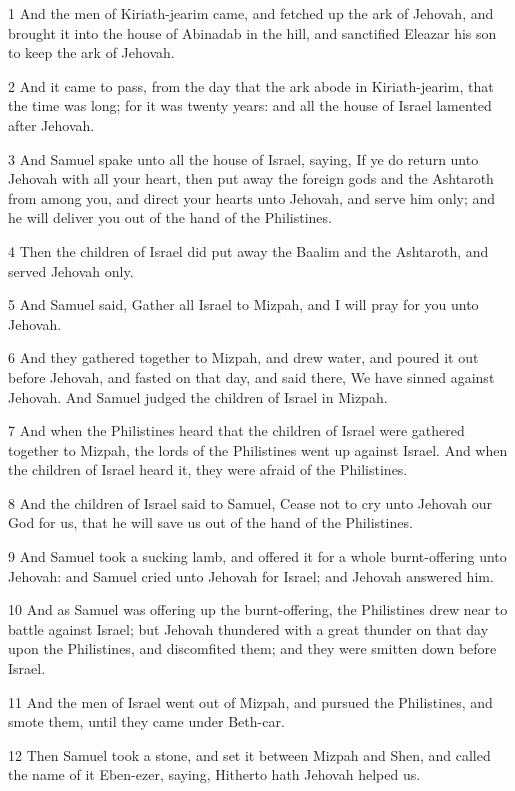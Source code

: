 \par 1 And the men of Kiriath-jearim came, and fetched up the ark of Jehovah, and brought it into the house of Abinadab in the hill, and sanctified Eleazar his son to keep the ark of Jehovah.
\par 2 And it came to pass, from the day that the ark abode in Kiriath-jearim, that the time was long; for it was twenty years: and all the house of Israel lamented after Jehovah.
\par 3 And Samuel spake unto all the house of Israel, saying, If ye do return unto Jehovah with all your heart, then put away the foreign gods and the Ashtaroth from among you, and direct your hearts unto Jehovah, and serve him only; and he will deliver you out of the hand of the Philistines.
\par 4 Then the children of Israel did put away the Baalim and the Ashtaroth, and served Jehovah only.
\par 5 And Samuel said, Gather all Israel to Mizpah, and I will pray for you unto Jehovah.
\par 6 And they gathered together to Mizpah, and drew water, and poured it out before Jehovah, and fasted on that day, and said there, We have sinned against Jehovah. And Samuel judged the children of Israel in Mizpah.
\par 7 And when the Philistines heard that the children of Israel were gathered together to Mizpah, the lords of the Philistines went up against Israel. And when the children of Israel heard it, they were afraid of the Philistines.
\par 8 And the children of Israel said to Samuel, Cease not to cry unto Jehovah our God for us, that he will save us out of the hand of the Philistines.
\par 9 And Samuel took a sucking lamb, and offered it for a whole burnt-offering unto Jehovah: and Samuel cried unto Jehovah for Israel; and Jehovah answered him.
\par 10 And as Samuel was offering up the burnt-offering, the Philistines drew near to battle against Israel; but Jehovah thundered with a great thunder on that day upon the Philistines, and discomfited them; and they were smitten down before Israel.
\par 11 And the men of Israel went out of Mizpah, and pursued the Philistines, and smote them, until they came under Beth-car.
\par 12 Then Samuel took a stone, and set it between Mizpah and Shen, and called the name of it Eben-ezer, saying, Hitherto hath Jehovah helped us.
